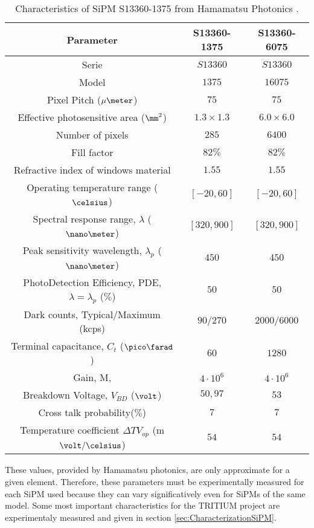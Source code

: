\begin{table}[htbp]
\begin{center}
\begin{tabular}{|c|c|c|}
\hline
Parameter & S13360-1375 & S13360-6075 \\
\hline \hline \hline
Serie & $S13360$ & $S13360$ \\ \hline
Model & $1375$ & $16075$ \\ \hline
Pixel Pitch ($\mu\meter$) & $75$ & $75$ \\ \hline
Effective photosensitive area ($\mm^2$) & $1.3 \times 1.3$ & $6.0 \times 6.0$ \\ \hline
Number of pixels & $285$ & $6400$ \\ \hline
Fill factor & $82\%$ & $82\%$ \\ \hline
Refractive index of windows material & $1.55$ & $1.55$ \\ \hline
Operating temperature range ($\celsius$) & $[-20,60]$ & $[-20,60]$ \\ \hline
Spectral response range, $\lambda$ ($\nano\meter$) & $[320, 900]$ & $[320, 900]$ \\ \hline
Peak sensitivity wavelength, $\lambda_p$ ($\nano\meter$) & $450$ & $450$ \\ \hline
PhotoDetection Efficiency, PDE, $\lambda=\lambda_p$ ($\%$) & $50$ & $50$ \\ \hline
Dark counts, Typical/Maximum (kcps) & $90/270$ & $2000/6000$ \\ \hline
Terminal capacitance, $C_t$ ($\pico\farad$) & $60$ & $1280$ \\ \hline
Gain, M, & $4 \cdot{} 10^6$ & $4 \cdot{} 10^6$ \\ \hline
Breakdown Voltage, $V_{BD}$ ($\volt$) & $50,97$ & $53$ \\ \hline
Cross talk probability($\%$) & $7$ & $7$ \\ \hline
Temperature coefficient $\Delta TV_{op}$ (m$\volt/\celsius$) & $54$ & $54$ \\ \hline
\end{tabular}
\caption{Characteristics of SiPM S13360-1375 from Hamamatsu Photonics \cite{DataSheetHammamatsu_1_SiPM_1375}.}
\label{tab:PropertiesOfSiPM1375}
\end{center}
\end{table}

These values, provided by Hamamatsu photonics, are only approximate for a given element. Therefore, these parameters must be experimentally measured for each SiPM used because they can vary significatively even for SiPMs of the same model. Some most important characteristics for the TRITIUM project are experimentaly measured and given in section \ref{sec:CharacterizationSiPM}. 

